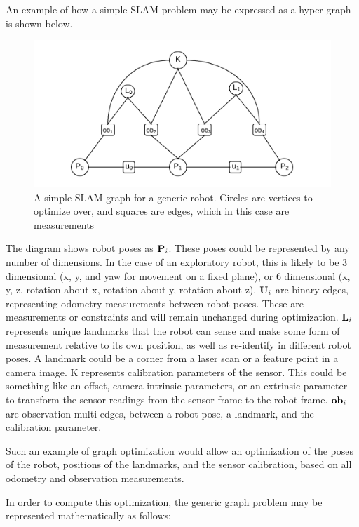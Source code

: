 An example of how a simple SLAM problem may be expressed as a hyper-graph is shown below.
\begin{figure}[h]
  \centering
      \includegraphics[width=1.0\textwidth]{chapters/images/simple_slam}
  \caption{A simple SLAM graph for a generic robot.  Circles are vertices to optimize over, and
squares are edges, which in this case are measurements}
\end{figure}

The diagram shows robot poses as $\mathbf P_i$.  These poses could be represented by any number of dimensions. In the case of an exploratory robot, this is likely to be 3 dimensional (x, y, and yaw for movement on a fixed plane), or 6 dimensional (x, y, z, rotation about x, rotation about y, rotation about z).  $\mathbf U_i$ are binary edges, representing odometry measurements between robot poses. These are measurements or constraints and will remain unchanged during optimization.  $\mathbf L_i$ represents unique landmarks that the robot can sense and make some form of measurement relative to its own position, as well as re-identify in different robot poses.  A landmark could be a corner from a laser scan or a feature point in a camera image.  K represents calibration parameters of the sensor.  This could be something like an offset, camera intrinsic parameters, or an extrinsic parameter to transform the sensor readings from the sensor frame to the robot frame.  $\mathbf {ob}_i$ are observation multi-edges, between a robot pose, a landmark, and the calibration parameter.

Such an example of graph optimization would allow an optimization of the poses of the robot, positions of the landmarks, and the sensor calibration, based on all odometry and observation measurements.

In order to compute this optimization, the generic graph problem may be represented mathematically as follows:

